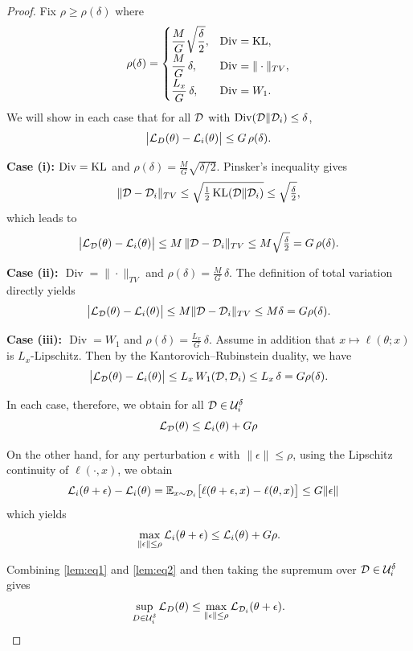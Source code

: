 \documentclass{article}
\theoremstyle{plain}
\theoremstyle{definition}
\theoremstyle{remark}
\DeclareMathOperator{\Div}{Div}
\begin{document}
\begin{proof}
Fix \(\rho\ge\rho(\delta)\) where 
\[
\rho(\delta)=
\begin{cases}
\displaystyle \frac{M}{G}\sqrt{\frac{\delta}{2}}, & \Div=\KL,\\[1ex]
\displaystyle \frac{M}{G}\,\delta,               & \Div=\|\cdot\|_{TV},\\[1ex]
\displaystyle \frac{L_x}{G}\,\delta,             & \Div=W_1.
\end{cases}
\]
We will show in each case that for all \({\mathcal{D}}\) with \(\Div(\gD\|\gD_i)\le\delta\),
\[
\bigl|{\mathcal{L}}_D(\theta)-{\mathcal{L}}_i(\theta)\bigr|\le G\,\rho(\delta).
\]

\medskip\noindent\textbf{Case (i):} \(\Div=\KL\) and \(\rho(\delta)=\tfrac{M}{G}\sqrt{\delta/2}\).  
Pinsker’s inequality gives
\[
\|{\mathcal{D}}-{\mathcal{D}}_i\|_{TV}\le\sqrt{\tfrac12\,\mathrm{KL}({\mathcal{D}}\|{\mathcal{D}}_i)}\le\sqrt{\tfrac{\delta}{2}},
\]
which leads to 
\[
\bigl|{\mathcal{L}}_{\mathcal{D}}(\theta)-{\mathcal{L}}_i(\theta)\bigr|
\le M\,\|{\mathcal{D}}-{\mathcal{D}}_i\|_{TV}
\le M\sqrt{\tfrac{\delta}{2}}
=G\,\rho(\delta).
\]

\medskip\noindent\textbf{Case (ii): \(\Div=\|\cdot\|_{TV}\)} and \(\rho(\delta)=\tfrac{M}{G}\,\delta\).
The definition of total variation directly yields
\[
\bigl|{\mathcal{L}}_{\mathcal{D}}(\theta)-{\mathcal{L}}_i(\theta)\bigr|
\le M\|{\mathcal{D}}-{\mathcal{D}}_i\|_{TV}
\le M\delta
=G\rho(\delta).
\]

\medskip\noindent\textbf{Case (iii): \(\Div=W_1\)} and \(\rho(\delta)=\tfrac{L_x}{G}\,\delta\).
Assume in addition that \(x\mapsto\ell(\theta;x)\) is \(L_x\)-Lipschitz.  Then by the Kantorovich–Rubinstein duality, we have 
\[
\bigl|{\mathcal{L}}_{\mathcal{D}}(\theta)-{\mathcal{L}}_i(\theta)\bigr|
\leq L_x\,W_1({\mathcal{D}},{\mathcal{D}}_i)
\leq L_x\,\delta
=G\rho(\delta).
\]

In each case, therefore, we obtain for all \({\mathcal{D}}\in{\mathcal{U}}_i^\delta\) 
\begin{equation}
{\mathcal{L}}_{\mathcal{D}}(\theta)\le{\mathcal{L}}_i(\theta)+G\rho    \label{lem:eq1}
\end{equation}


On the other hand, for any perturbation $\epsilon$ with $\|\epsilon\|\leq \rho$, using the Lipschitz continuity of $\ell(\cdot, x)$, we obtain
\begin{align*}
{\mathcal{L}}_{i}(\theta+{\epsilon})-{\mathcal{L}}_{i}(\theta)&=\mathbb{E}_{x\sim{\mathcal{D}}_i}\bigl[\ell(\theta+{\epsilon},x)-\ell(\theta,x)\bigr]\leq G\|{\epsilon}\|
\end{align*}
which yields 
\begin{align}
\max_{\|{\epsilon}\|\le\rho}{\mathcal{L}}_{i}(\theta+{\epsilon})
\leq {\mathcal{L}}_{i}(\theta)+G\rho. \label{lem:eq2}
\end{align}

Combining \eqref{lem:eq1} and \eqref{lem:eq2} and then taking the supremum over ${\mathcal{D}}\in {\mathcal{U}}_i^\delta$ gives 
\[
\sup_{D\in{\mathcal{U}}_i^\delta}{\mathcal{L}}_D(\theta) \leq \max_{\|{\epsilon}\|\le\rho}{\mathcal{L}}_{{\mathcal{D}}_i}(\theta+{\epsilon}).
\]

\end{proof}
\end{document}
